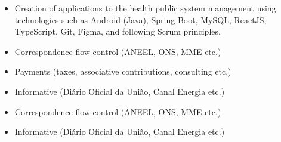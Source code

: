 \documentclass[10pt,a4paper,ragged2e]{altacv}
\begin{document}


\begin{fullwidth}
\makecvheader
\end{fullwidth}




\begin{itemize}
\item Creation of applications to the health public system management using technologies such as Android (Java), Spring Boot, MySQL, ReactJS, TypeScript, Git, Figma, and following Scrum principles.
\end{itemize}

\divider


\begin{itemize}
\item Correspondence flow control (ANEEL, ONS, MME etc.)
\item Payments (taxes, associative contributions, consulting etc.)
\item Informative (Diário Oficial da União, Canal Energia etc.)
\end{itemize}

\divider


\begin{itemize}
\item Correspondence flow control (ANEEL, ONS, MME etc.)
\item Informative (Diário Oficial da União, Canal Energia etc.)
\end{itemize}
\end{document}
